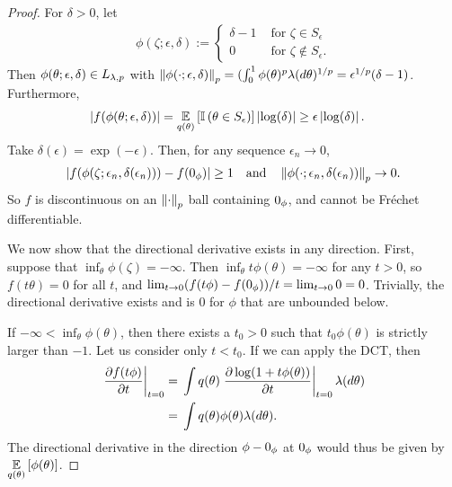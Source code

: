 \begin{lem}
\begin{proof}
For $\delta > 0$, let
%
\begin{align*}
%
\phi(\zeta; \epsilon, \delta) :=
\begin{cases}
    \delta - 1      & \textrm{ for }\zeta\in S_\epsilon \\
    0      & \textrm{ for }\zeta\notin S_\epsilon.
\end{cases}
%
\end{align*}
%
Then $\phi(\theta; \epsilon, \delta) \in {L_{\lambda,p}}$ with $\left\Vert\phi(\cdot;
\epsilon, \delta)\right\Vert_p = (\int_0^1 \phi(\theta)^p \lambda(d\theta)^{1/p}
=\epsilon^{1/p} (\delta - 1)$.  Furthermore,
%
\begin{align*}
%
\abs{f(\phi(\theta; \epsilon, \delta))} ={}&
    \expect{\q(\theta)}{\ind{\theta \in S_\epsilon}} \abs{\log(\delta)} \ge
    \epsilon \abs{\log(\delta)}.
%
\end{align*}
Take $\delta(\epsilon) = \exp(-\epsilon)$.  Then, for any sequence $\epsilon_n
\rightarrow 0$,
%
\begin{align*}
%
\abs{f(\phi(\zeta; \epsilon_n, \delta(\epsilon_n))) - f(\phiz)} \ge{} 1
\mathtxt{and}
\norm{\phi(\cdot; \epsilon_n, \delta(\epsilon_n))}_p \rightarrow{} 0.
%
\end{align*}
%
So $f$ is discontinuous on an $\left\Vert\cdot\right\Vert_p$ ball containing $0_\phi$, and
cannot be Fr{\'e}chet differentiable.

We now show that the directional derivative exists in any direction.  First,
suppose that $\inf_{\theta} \phi(\zeta) = -\infty$.  Then $\inf_{\theta} t
\phi(\theta) = -\infty$ for any $t > 0$, so $f(t\theta) = 0$ for all $t$, and
$\lim_{t \rightarrow 0} (f(t \phi) - f(0_\phi)) / t = \lim_{t \rightarrow 0} 0 =
0$.  Trivially, the directional derivative exists and is $0$ for $\phi$ that are
unbounded below.

If $-\infty < \inf_\theta \phi(\theta)$, then there exists a $t_0 > 0$ such that
$t_0 \phi(\theta)$ is strictly larger than $-1$.  Let us consider only $t <
t_0$. If we can apply the DCT, then
%
\begin{align*}
%
\fracat{\partial f(t \phi)}{\partial t}{t=0} ={}&
    \int \q(\theta) \fracat{\partial \log(1 + t \phi(\theta))}{\partial t}{t=0}
        \lambda(d\theta)
\\={}&
\int \q(\theta) \phi(\theta) \lambda(d\theta).
%
\end{align*}
%
The directional derivative in the direction $\phi - 0_\phi$ at $0_\phi$ would thus
be given by $\underset{q(\theta)}{\mathbb{E}}\left[\phi(\theta)\right]$.


\end{proof}
\end{lem}
